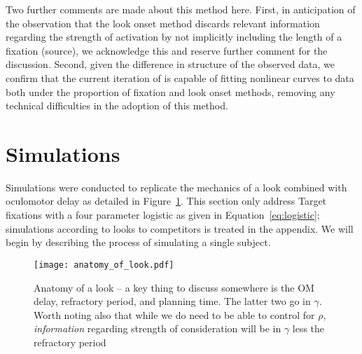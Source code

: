 Two further comments are made about this method here. First, in anticipation of the observation that the look onset method discards relevant information regarding the strength of activation by not implicitly including the length of a fixation (source), we acknowledge this and reserve further comment for the discussion. Second, given the difference in structure of the observed data, we confirm that the current iteration of  is capable of fitting nonlinear curves to data both under the proportion of fixation and look onset methods, removing any technical difficulties in the adoption of this method.



\section{Simulations}

Simulations were conducted to replicate the mechanics of a look combined with oculomotor delay as detailed in Figure~\ref{fig:anatomy_of_look}. This section only address Target fixations with a four parameter logistic as given in Equation~\ref{eq:logistic}; simulations according to looks to competitors is treated in the appendix. We will begin by describing the process of simulating a single subject.

\begin{figure}[H]
\centering
\texttt{[image: anatomy\_of\_look.pdf]}
\caption{Anatomy of a look -- a key thing to discuss somewhere is the OM delay, refractory period, and planning time. The latter two go in $\gamma$. Worth noting also that while we do need to be able to control for $\rho$, \textit{information} regarding strength of consideration will be in $\gamma$ less the refractory period}
\label{fig:anatomy_of_look}
\end{figure}


